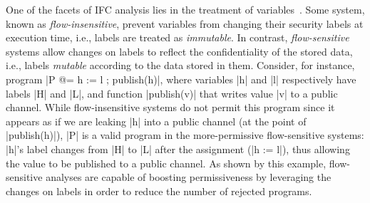 One of the facets of IFC analysis lies in the treatment of
variables~\cite{Hunt:2006}. Some system, known as \emph{flow-insensitive},
prevent variables from changing their security labels at execution time, i.e., labels
are treated as \emph{immutable}. In contrast, \emph{flow-sensitive} systems
allow changes on labels to reflect the confidentiality of the stored data, i.e.,
labels \emph{mutable} according to the data stored in them.
Consider, for instance, program |P @= h := l ; publish(h)|, where variables |h| and |l| respectively have labels |H| and |L|, and
function |publish(v)| that writes value |v| to a public channel.
%
While flow-insensitive systems do not permit this program since it appears as if
we are leaking |h| into a public channel (at the point of |publish(h)|), |P| is
a valid program in the more-permissive flow-sensitive systems: |h|'s label
changes from |H| to |L| after the assignment (|h := l|), thus allowing the value
to be published to a public channel. As shown by this example, flow-sensitive
analyses are capable of boosting permissiveness by leveraging the changes on labels
in order to reduce the number of
rejected programs. %






